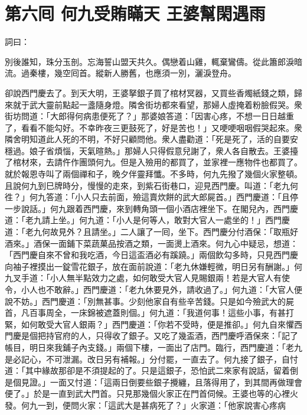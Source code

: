 
\chapter*{第六囘 何九受賄瞞天 王婆幫閑遇雨}


詞曰：

\begin{myquote} 
別後誰知，珠分玉剖。忘海誓山盟天共久。偶戀着山雞，輒棄鸞儔。從此簫郎淚暗流。過秦樓，幾空囘首。縱新人勝舊，也應須一別，灑淚登舟。

\end{myquote} 

卻說西門慶去了。到天大明，王婆拏銀子買了棺材冥器，又買些香燭紙錢之類，歸來就于武大靈前點起一盞隨身燈。隣舍街坊都來看望，那婦人虛掩着粉臉假哭。衆街坊問道：「大郎得何病患便死了？」那婆娘答道：「因害心疼，不想一日日越重了，看看不能勾好。不幸昨夜三更鼓死了，好是苦也！」又哽哽咽咽假哭起來。衆隣舍明知道此人死的不明，不好只顧問他。衆人盡勸道：「死是死了，活的自要安穩過。娘子省煩惱，天氣暄熱。」那婦人只得假意兒謝了，衆人各自散去。王婆擡了棺材來，去請仵作團頭何九。但是入殮用的都買了，並家裡一應物件也都買了。就於報恩寺叫了兩個禪和子，晚夕伴靈拜懺。不多時，何九先撥了幾個火家整頓。且說何九到巳牌時分，慢慢的走來，到紫石街巷口，迎見西門慶。叫道：「老九何徃？」何九答道：「小人只去前面，殮這賣炊餅的武大郎屍首。」西門慶道：「且停一步說話。」何九跟着西門慶，來到轉角頭一個小酒店裡坐下。在閣兒內，西門慶道：「老九請上坐。」何九道：「小人是何等人，敢對大官人一處坐的！」西門慶道：「老九何故見外？且請坐。」二人讓了一囘，坐下。西門慶分付酒保：「取瓶好酒來。」酒保一面鋪下菜蔬菓品按酒之類，一面燙上酒來。何九心中疑忌，想道：「西門慶自來不曾和我吃酒，今日這盃酒必有蹊蹺。」兩個飲勾多時，只見西門慶向袖子裡摸出一錠雪花銀子，放在面前說道：「老九休嫌輕微，明日另有酬謝。」何九叉手道：「小人無半點效力之處，如何敢受大官人見賜銀兩！若是大官人有使令，小人也不敢辭。」西門慶道：「老九休要見外，請收過了。」何九道：「大官人便說不妨。」西門慶道：「別無甚事。少刻他家自有些辛苦錢。只是如今殮武大的屍首，凡百事周全，一床錦被遮蓋則個。」何九道：「我道何事！這些小事，有甚打緊，如何敢受大官人銀兩？」西門慶道：「你若不受時，便是推卻。」何九自來懼西門慶是個把持官府的人，只得收了銀子。又吃了幾盃酒，西門慶呼酒保來：「記了帳目，明日來我鋪子內支錢。」兩個下樓，一面出了店門。臨行，西門慶道：「老九是必記心，不可泄漏。改日另有補報。」{}分付罷，一直去了。何九接了銀子，自忖道：「其中緣故那卻是不須提起的了。只是這銀子，恐怕武二來家有說話，留着倒是個見證。」一面又忖道：「這兩日倒要些銀子攪纏，且落得用了，到其間再做理會便了。」於是一直到武大門首。只見那幾個火家正在門首伺候。王婆也等的心裡火發。何九一到，便問火家：「這武大是甚病死了？」火家道：「他家說害心疼病